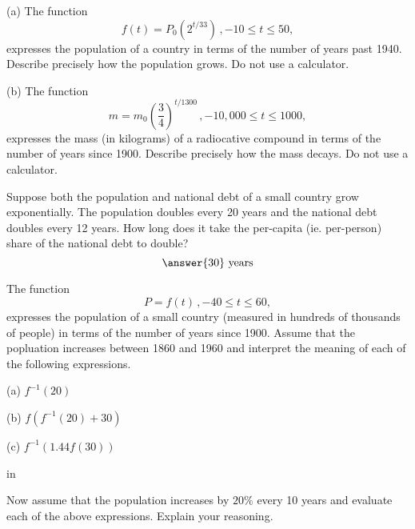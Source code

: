 \documentclass{ximera}
\newcommand{\pskip}{\vskip 0.1 in}
\begin{document}
\begin{question} \label{Q23:ExponentialG}
(a) The function 
\[
   f(t) = P_0 (2^{t/33}) \, , -10\leq t \leq 50 ,
\]
expresses the population of a country in terms of the number of years past 1940. Describe precisely how the population grows. Do not use a calculator.

(b) The function 
\[
   m = m_0 \left( \frac{3}{4} \right)^{t/1300} \, , -10,000\leq t \leq 1000 ,
\]
expresses the mass (in kilograms) of a radiocative compound in terms of the number of years since 1900. Describe precisely how the mass decays. Do not use a calculator.

\end{question}



\begin{question}   \label{Q9:ExponentialG}
Suppose both the population and national debt of a small country grow exponentially. The population doubles every 20 years and the national debt doubles every 12 years. How long does it take the per-capita (ie. per-person) share of the national debt to double?
\[
    \answer{30} \text{ years}
\]
\end{question}



\begin{question} \label{Q24:ExponentialG}
The function 
\[
   P = f(t) \, , -40\leq t \leq 60 ,
\]
expresses the population of a small country (measured in hundreds of thousands of people) in terms of the number of years since 1900. Assume that the popluation increases between 1860 and 1960 and interpret the meaning of each of the following expressions.

(a) $f^{-1}(20)$

(b) $f(f^{-1}(20) + 30)$

(c) $f^{-1}(1.44 f(30))$

\pskip

Now assume that the population increases by $20\%$ every 10 years and evaluate each of the above expressions. Explain your reasoning.


\end{question}
\end{document}
